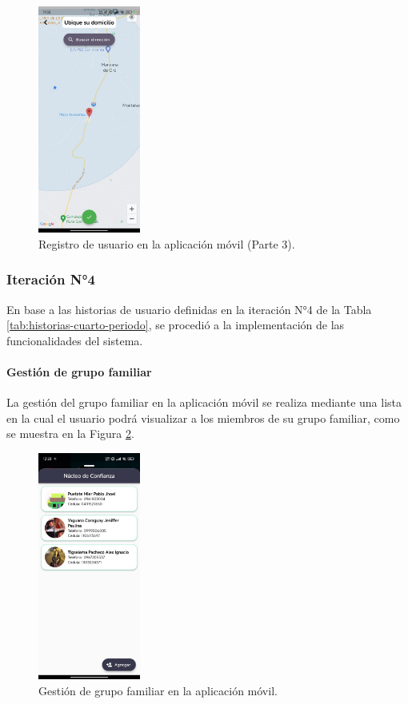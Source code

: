 \begin{figure}[H]
    \centering
    \includegraphics[width=0.3\textwidth]{chapters/III-resultados-y-discusion/resources/images/registro-usuario-movil-3.png}
    \caption{Registro de usuario en la aplicación móvil (Parte 3).}
    \label{fig:registro-usuario-movil-3}
\end{figure}

\subsubsection{Iteración N°4}

En base a las historias de usuario definidas en la iteración N°4 de la Tabla \ref{tab:historias-cuarto-periodo}, se
procedió a la implementación de las funcionalidades del sistema.

\paragraph{Gestión de grupo familiar}
La gestión del grupo familiar en la aplicación móvil se realiza mediante una lista en la cual el usuario podrá visualizar a
los miembros de su grupo familiar, como se muestra en la Figura \ref{fig:grupo-familiar-movil}.

\begin{figure}[H]
    \centering
    \includegraphics[width=0.3\textwidth]{chapters/III-resultados-y-discusion/resources/images/grupo-familiar-movil.png}
    \caption{Gestión de grupo familiar en la aplicación móvil.}
    \label{fig:grupo-familiar-movil}
\end{figure}

